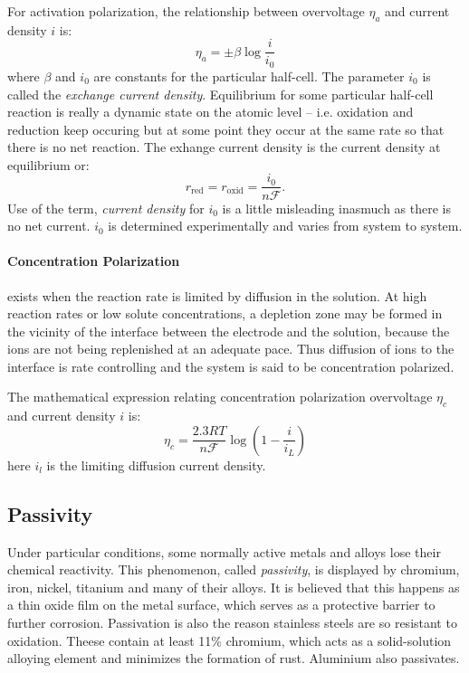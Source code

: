For activation polarization, the relationship between overvoltage $\eta_a$ and current density $i$ is:
\[ 
\eta_a = \pm \beta  \log \frac{i}{i_0}
\]
where $\beta$ and $i_0$ are constants for the particular half-cell. The parameter $i_0$ is called the \textit{exchange current density}. Equilibrium for some particular half-cell reaction is really a dynamic state on the atomic level -- i.e. oxidation and reduction keep occuring but at some point they occur at the same rate so that there is no net reaction. The exhange current density is the current density at equilibrium or:
\[ 
r_{\mathrm{red}} = r_{\mathrm{oxid}} = \frac{i_0}{n \mathcal{F}}
.\]
Use of the term, \textit{current density} for $i_0$ is a little misleading inasmuch as there is no net current. $i_0$ is determined experimentally and varies from system to system.

\paragraph{Concentration Polarization} exists when the reaction rate is limited by diffusion in the solution. At high reaction rates or low solute concentrations, a depletion zone may be formed in the vicinity of the interface between the electrode and the solution, because the ions are not being replenished at an adequate pace. Thus diffusion of ions to the interface is rate controlling and the system is said to be concentration polarized.

The mathematical expression relating concentration polarization overvoltage $\eta_c$ and current density $i$ is:
\[ 
\eta_c = \frac{\num{2,3} RT}{n \mathcal{F}} \log \left( 1 - \frac{i}{i_L} \right)
\]
here $i_l$ is the limiting diffusion current density. 

\subsection{Passivity}
Under particular conditions, some normally active metals and alloys lose their chemical reactivity. This phenomenon, called \textit{passivity}, is displayed by chromium, iron, nickel, titanium and many of their alloys. It is believed that this happens as a thin oxide film on the metal surface, which serves as a protective barrier to further corrosion. Passivation is also the reason stainless steels are so resistant to oxidation. Theese contain at least 11\% chromium, which acts as a solid-solution alloying element and minimizes the formation of rust. Aluminium also passivates.


